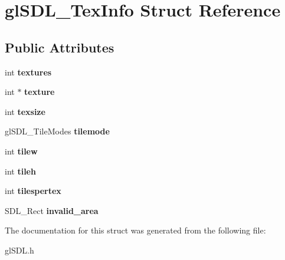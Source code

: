 \hypertarget{structglSDL__TexInfo}{\section{gl\-S\-D\-L\-\_\-\-Tex\-Info Struct Reference}
\label{structglSDL__TexInfo}
}
\subsection*{Public Attributes}
\begin{DoxyCompactItemize}
\item 
\hypertarget{structglSDL__TexInfo_a87dc3088907b6044c00a5d59b20339c1}{int {\bfseries textures}}\label{structglSDL__TexInfo_a87dc3088907b6044c00a5d59b20339c1}

\item 
\hypertarget{structglSDL__TexInfo_ae511c9ef4af8bc16265e3ead7b24b990}{int $\ast$ {\bfseries texture}}\label{structglSDL__TexInfo_ae511c9ef4af8bc16265e3ead7b24b990}

\item 
\hypertarget{structglSDL__TexInfo_a57385686d96338a5252cb2bac23173f4}{int {\bfseries texsize}}\label{structglSDL__TexInfo_a57385686d96338a5252cb2bac23173f4}

\item 
\hypertarget{structglSDL__TexInfo_acbca6b79a90db09291e7aa80624b60d9}{gl\-S\-D\-L\-\_\-\-Tile\-Modes {\bfseries tilemode}}\label{structglSDL__TexInfo_acbca6b79a90db09291e7aa80624b60d9}

\item 
\hypertarget{structglSDL__TexInfo_a0fcc16178017a7e6d8318a93b58174af}{int {\bfseries tilew}}\label{structglSDL__TexInfo_a0fcc16178017a7e6d8318a93b58174af}

\item 
\hypertarget{structglSDL__TexInfo_aa1f9a12d36e6b8d235ce87e2336a17c4}{int {\bfseries tileh}}\label{structglSDL__TexInfo_aa1f9a12d36e6b8d235ce87e2336a17c4}

\item 
\hypertarget{structglSDL__TexInfo_aec2a97a73d53db553ae204563944a9b3}{int {\bfseries tilespertex}}\label{structglSDL__TexInfo_aec2a97a73d53db553ae204563944a9b3}

\item 
\hypertarget{structglSDL__TexInfo_a566ec9121209f788abb8ae20dad26135}{S\-D\-L\-\_\-\-Rect {\bfseries invalid\-\_\-area}}\label{structglSDL__TexInfo_a566ec9121209f788abb8ae20dad26135}

\end{DoxyCompactItemize}


The documentation for this struct was generated from the following file\-:\begin{DoxyCompactItemize}
\item 
gl\-S\-D\-L.\-h\end{DoxyCompactItemize}
